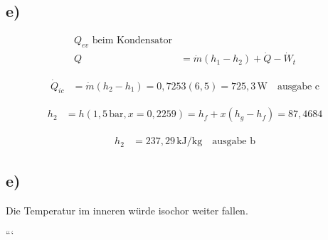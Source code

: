 

\subsection*{e)}
\begin{align*}
    Q_{ev} \text{ beim Kondensator} \\
    Q &= \dot{m} (h_1 - h_2) + \dot{Q} - \dot{W}_t
\end{align*}

\begin{align*}
    \dot{Q}_{ic} &= \dot{m} (h_2 - h_1) = 0,7253 (6,5) = 725,3 \, \text{W} \quad \text{ausgabe c}
\end{align*}

\begin{align*}
    h_2 &= h(1,5 \, \text{bar}, x = 0,2259) = h_f + x (h_g - h_f) = 87,4684
\end{align*}

\begin{align*}
    h_2 &= 237,29 \, \text{kJ/kg} \quad \text{ausgabe b}
\end{align*}



\subsection*{e)}
Die Temperatur im inneren würde isochor weiter fallen.

```